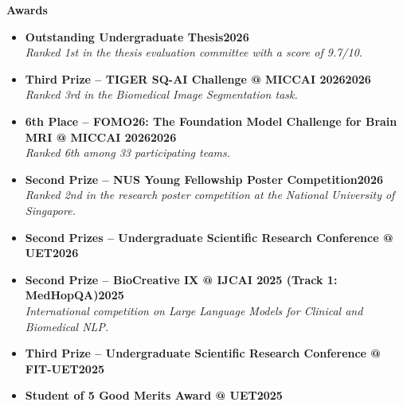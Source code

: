 \documentclass[11pt,a4paper]{article}
\newcommand{\smaller}{\small}
\newcommand{\heading}[2]{
  \noindent#1\hfill{\color{cvtextgray}#2}\\
}
\newcommand{\headingBf}[2]{
  \heading{\textbf{#1}}{\textbf{#2}}
}
\newcommand{\headingIt}[2]{
  \heading{\textit{#1}}{\textit{#2}}
}
\begin{document}
\textbf{Awards}
\begin{itemize}[label={\smaller$\bullet$}]
    \item \headingBf{Outstanding Undergraduate Thesis}{2026}
    \headingIt{Ranked 1st in the thesis evaluation committee with a score of 9.7/10.}{}

    \item \headingBf{Third Prize -- TIGER SQ-AI Challenge @ MICCAI 2026}{2026}
    \headingIt{Ranked 3rd in the Biomedical Image Segmentation task.}{}

    \item \headingBf{6th Place -- FOMO26: The Foundation Model Challenge for Brain MRI @ MICCAI 2026}{2026}
    \headingIt{Ranked 6th among 33 participating teams.}{}

    \item \headingBf{Second Prize -- NUS Young Fellowship Poster Competition}{2026}
\headingIt{Ranked 2nd in the research poster competition at the National University of Singapore.}{}

    \item \headingBf{Second Prizes -- Undergraduate Scientific Research Conference @ UET}{2026}

    \item \headingBf{Second Prize -- BioCreative IX @ IJCAI 2025 (Track 1: MedHopQA)}{2025}
    \headingIt{International competition on Large Language Models for Clinical and Biomedical NLP.}{}

    \item \headingBf{Third Prize -- Undergraduate Scientific Research Conference @ FIT-UET}{2025}


    \item \headingBf{Student of 5 Good Merits Award @ UET}{2025}
\end{itemize}
\end{document}
